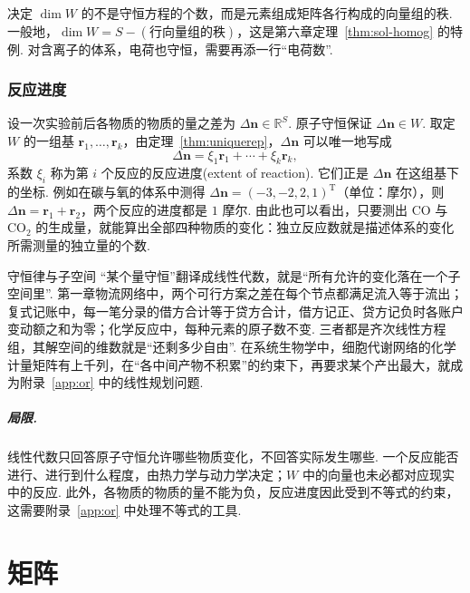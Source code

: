 \documentclass[lang=cn,10.5pt,scheme=chinese,toc=twocol,section,chinesefont=nofont,
twoside,citestyle=gb7714-2015,bibstyle=gb7714-2015]{elegantbook}
\DeclareRobustCommand{\textbf}[1]{{\lnsemiboldlatin\lnsemiboldcjk #1}}
\newcommand{\vv}[1]{\boldsymbol{#1}}
\newcommand{\trans}{\mathrm{T}}             %
\numberwithin{equation}{section}   %
\begin{document}
决定 $\dim W$ 的不是守恒方程的个数，而是元素组成矩阵各行构成的向量组的秩. 一般地，$\dim W=S-(\text{行向量组的秩})$，这是第六章定理~\ref{thm:sol-homog} 的特例. 对含离子的体系，电荷也守恒，需要再添一行“电荷数”.

\subsection{反应进度}

设一次实验前后各物质的物质的量之差为 $\Delta\vv n\in\mathbb{R}^S$. 原子守恒保证 $\Delta\vv n\in W$. 取定 $W$ 的一组基 $\vv r_1,\ldots,\vv r_k$，由定理~\ref{thm:uniquerep}，$\Delta\vv n$ 可以唯一地写成
\[
  \Delta\vv n=\xi_1\vv r_1+\cdots+\xi_k\vv r_k,
\]
系数 $\xi_i$ 称为第 $i$ 个反应的\textbf{反应进度}(extent of reaction). 它们正是 $\Delta\vv n$ 在这组基下的坐标. 例如在碳与氧的体系中测得 $\Delta\vv n=(-3,-2,2,1)^\trans$（单位：摩尔），则 $\Delta\vv n=\vv r_1+\vv r_2$，两个反应的进度都是 $1$ 摩尔. 由此也可以看出，只要测出 $\mathrm{CO}$ 与 $\mathrm{CO_2}$ 的生成量，就能算出全部四种物质的变化：独立反应数就是描述体系的变化所需测量的独立量的个数.

\begin{linkbox}{守恒律与子空间}
  “某个量守恒”翻译成线性代数，就是“所有允许的变化落在一个子空间里”. 第一章物流网络中，两个可行方案之差在每个节点都满足流入等于流出；复式记账中，每一笔分录的借方合计等于贷方合计，借方记正、贷方记负时各账户变动额之和为零；化学反应中，每种元素的原子数不变. 三者都是齐次线性方程组，其解空间的维数就是“还剩多少自由”. 在系统生物学中，细胞代谢网络的化学计量矩阵有上千列，在“各中间产物不积累”的约束下，再要求某个产出最大，就成为附录~\ref{app:or} 中的线性规划问题.
\end{linkbox}

\paragraph*{局限.} 线性代数只回答原子守恒\textbf{允许}哪些物质变化，不回答实际\textbf{发生}哪些. 一个反应能否进行、进行到什么程度，由热力学与动力学决定；$W$ 中的向量也未必都对应现实中的反应. 此外，各物质的物质的量不能为负，反应进度因此受到不等式的约束，这需要附录~\ref{app:or} 中处理不等式的工具.

\ExVectorSpace
\chapter{矩阵}\label{ch:matrix}
\end{document}
